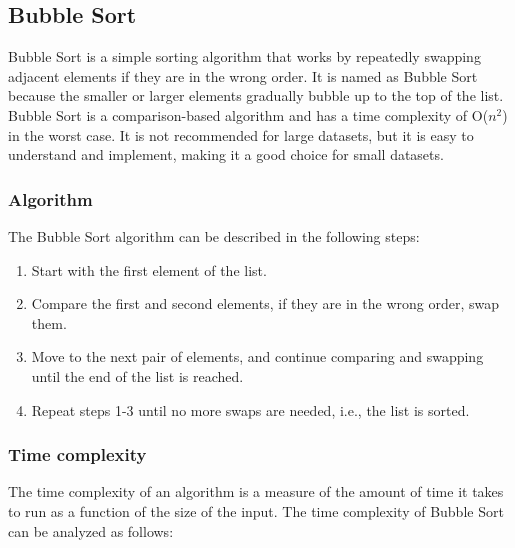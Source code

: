 \documentclass[a4paper, 11pt, oneside]{book} %
\begin{document}
\subsection{Bubble Sort}
Bubble Sort is a simple sorting algorithm that works by repeatedly swapping adjacent elements if they are in the wrong order. It is named as Bubble Sort because the smaller or larger elements gradually bubble up to the top of the list. Bubble Sort is a comparison-based algorithm and has a time complexity of O($n^2$) in the worst case. It is not recommended for large datasets, but it is easy to understand and implement, making it a good choice for small datasets.

\subsubsection{Algorithm}
The Bubble Sort algorithm can be described in the following steps:
\begin{enumerate}
  \item Start with the first element of the list.
  \item Compare the first and second elements, if they are in the wrong order, swap them.
  \item Move to the next pair of elements, and continue comparing and swapping until the end of the list is reached.
  \item Repeat steps 1-3 until no more swaps are needed, i.e., the list is sorted.
  
\end{enumerate}

\subsubsection{Time complexity}
The time complexity of an algorithm is a measure of the amount of time it takes to run as a function of the size of the input. The time complexity of Bubble Sort can be analyzed as follows:
\end{document}
